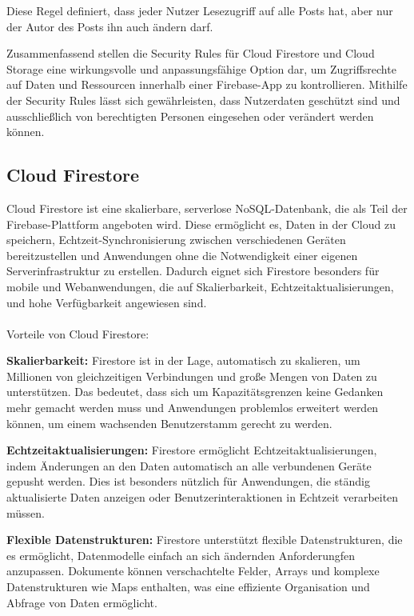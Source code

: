 Diese Regel definiert, dass jeder Nutzer Lesezugriff auf
alle Posts hat, aber nur der Autor des Posts ihn auch ändern
darf.

Zusammenfassend stellen die Security Rules für Cloud Firestore und Cloud Storage eine wirkungsvolle und anpassungsfähige Option dar, um Zugriffsrechte auf Daten und Ressourcen innerhalb einer Firebase-App zu kontrollieren. Mithilfe der Security Rules lässt sich gewährleisten, dass Nutzerdaten geschützt sind und ausschließlich von berechtigten Personen eingesehen oder verändert werden können.



\subsection{Cloud Firestore}
\author{Sandin Habibovic}

Cloud Firestore\cite{firestore} ist eine skalierbare, serverlose NoSQL-Datenbank, die als Teil der Firebase-Plattform angeboten wird. Diese ermöglicht es, Daten in der Cloud zu speichern, Echtzeit-Synchronisierung zwischen verschiedenen Geräten bereitzustellen und Anwendungen ohne die Notwendigkeit einer eigenen Serverinfrastruktur zu erstellen. Dadurch eignet sich Firestore besonders für mobile und Webanwendungen, die auf Skalierbarkeit, Echtzeitaktualisierungen, und hohe Verfügbarkeit angewiesen sind.
\\\\
Vorteile von Cloud Firestore:

\textbf{Skalierbarkeit:} Firestore ist in der Lage, automatisch zu skalieren, um Millionen von gleichzeitigen Verbindungen und große Mengen von Daten zu unterstützen. Das bedeutet, dass sich um Kapazitätsgrenzen keine Gedanken mehr gemacht werden muss und Anwendungen problemlos erweitert werden können, um einem wachsenden Benutzerstamm gerecht zu werden.

\textbf{Echtzeitaktualisierungen:} Firestore ermöglicht
Echtzeitaktualisierungen, indem Änderungen an den Daten
automatisch an alle verbundenen Geräte gepusht werden. Dies
ist besonders nützlich für Anwendungen, die ständig
aktualisierte Daten anzeigen oder Benutzerinteraktionen in
Echtzeit verarbeiten müssen.

\textbf{Flexible Datenstrukturen:} Firestore unterstützt flexible Datenstrukturen, die es ermöglicht, Datenmodelle einfach an sich ändernden Anforderungfen anzupassen. Dokumente können verschachtelte Felder, Arrays und komplexe Datenstrukturen wie Maps enthalten, was eine effiziente Organisation und Abfrage von Daten ermöglicht.

